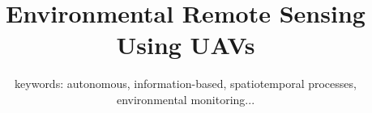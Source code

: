 \documentclass[10pt,twoside,a4paper]{article}
\begin{document}
\title{Environmental Remote Sensing Using UAVs}
\subtitle{\normalsize{keywords: autonomous, information-based, spatiotemporal processes, environmental 
monitoring...}}


\maketitle
\pagestyle{plain}


\cleardoublepage

\pagestyle{fancy}






%



\end{document}
